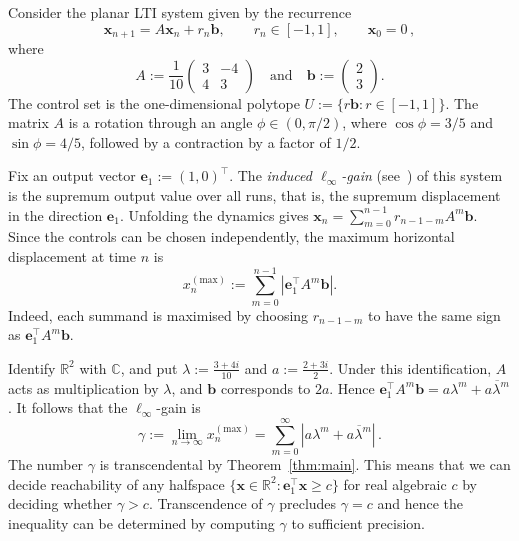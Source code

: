 \documentclass[a4paper,UKenglish,cleveref, autoref, thm-restate]{lipics-v2021}
\begin{document}
\begin{example}
\label{ex:gain}
Consider the planar LTI system given by the recurrence
\[ \boldsymbol x_{n+1}=A\boldsymbol x_n+r_n \boldsymbol b, \qquad r_n\in[-1,1], \qquad \boldsymbol x_0=0\, , \]
where
\[
A:=\frac1{10}
\begin{pmatrix}
3 & -4\\
4 & 3
\end{pmatrix}\quad\text{and}
\quad
\boldsymbol b:=\begin{pmatrix}2\\3\end{pmatrix}.
\]
The control set is the one-dimensional polytope
\(U:=\{r\boldsymbol b:r\in[-1,1]\} \).
The matrix $A$ is a rotation through an
angle $\phi\in(0,\pi/2)$, where
$\cos\phi=3/5$ and $\sin\phi=4/5$, followed by a contraction
by a factor of $1/2$.

Fix an output vector $\boldsymbol e_1:=(1,0)^\top$.  The \emph{induced $\ell_\infty$-gain} (see~\cite[Section 5.2.5]{boyd1991linear}) of this system is the supremum output value 
over all runs, that is, the supremum displacement 
in the direction $\boldsymbol e_1$.  %
Unfolding the dynamics gives
\(\boldsymbol x_n=\sum_{m=0}^{n-1}r_{n-1-m}A^m \boldsymbol b\).
Since the controls can be chosen independently, the maximum
horizontal displacement at time $n$ is
\[
x^{(\mathrm{max})}_n := \sum_{m=0}^{n-1}\left|\boldsymbol e_1^\top A^m \boldsymbol b\right|.
\]
Indeed, each summand is maximised by choosing $r_{n-1-m}$ to
have the same sign as $\boldsymbol e_1^\top A^m \boldsymbol b$.

Identify $\mathbb R^2$ with $\mathbb C$, and put
\(
\lambda:=\frac{3+4i}{10}\) and \(a:=\frac{2+3i}{2}\). 
Under this identification, $A$ acts as multiplication by
$\lambda$, and $\boldsymbol b$ corresponds to $2a$. Hence
\(\boldsymbol e_1^\top A^m \boldsymbol b
=a\lambda^m+\overline{a\lambda^m}\). 
It follows that the  $\ell_\infty$-gain is
\[ \gamma:= \lim_{n\to\infty}x^{(\mathrm{max})}_n
  =\sum_{m=0}^{\infty}
    \left|a\lambda^m+\overline{a\lambda^m}\right|  \, .
\]
The number $\gamma$ is transcendental by
Theorem~\ref{thm:main}.  This means that we can decide reachability of any halfspace $\{ \boldsymbol x \in \mathbb R^2: \boldsymbol e_1^\top \boldsymbol x\geq c\}$
for real algebraic $c$ by deciding whether $\gamma>c$.  Transcendence of $\gamma$ precludes $\gamma=c$ and hence the inequality can be determined by computing $\gamma$ to sufficient precision.
\end{example}
\end{document}
